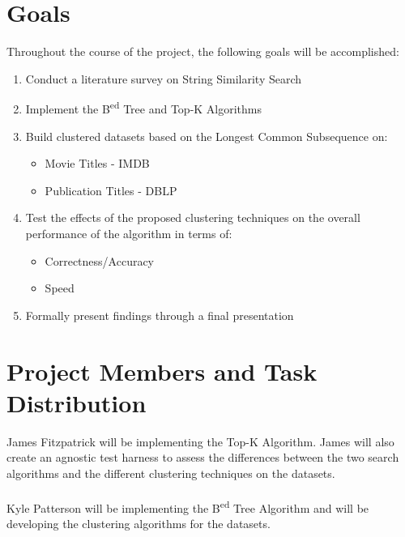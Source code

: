 \documentclass[pdftex,12pt,letter]{article}
\begin{document}
\section{Goals}
Throughout the course of the project, the following goals will be accomplished:
\begin{enumerate}
\item Conduct a literature survey on String Similarity Search
\item Implement the B\textsuperscript{ed} Tree and Top-K Algorithms
\item Build clustered datasets based on the Longest Common Subsequence on:
\begin{itemize}
\item Movie Titles - IMDB
\item Publication Titles - DBLP
\end{itemize}
\item Test the effects of the proposed clustering techniques on the overall performance of the algorithm in terms of:
\begin{itemize}
\item Correctness/Accuracy
\item Speed
\end{itemize}
\item Formally present findings through a final presentation
\end{enumerate}

\section{Project Members and Task Distribution}
James Fitzpatrick will be implementing the Top-K  Algorithm. James will also create an agnostic test harness to assess the differences between the two search algorithms and the different clustering techniques on the datasets. 
\\\\
Kyle Patterson will be implementing the B\textsuperscript{ed} Tree Algorithm and will be developing the clustering algorithms for the datasets. 
\end{document}
